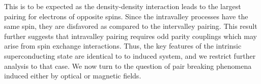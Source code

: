 This is to be expected as the density-density interaction
leads to the largest pairing for electrons of opposite spins.
Since the intravalley processes have the same spin,
they are disfavored as compared to the intervalley pairing.
This result further suggests that intravalley pairing requires
odd parity couplings which may arise from spin exchange interactions.
Thus, the key features of the intrinsic superconducting state
are identical to to induced system, and we restrict further
analysis to that case.
We now turn to the question of pair breaking phenomena
induced either by optical or magnetic fields.
